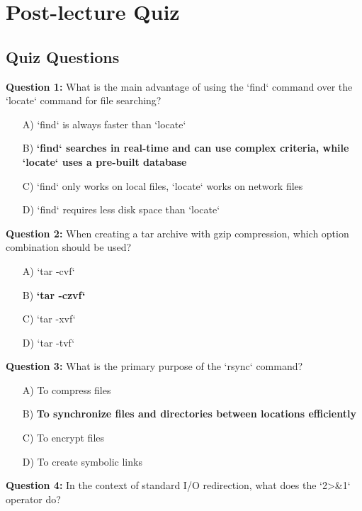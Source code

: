 \section{Post-lecture Quiz}
\label{sec:file-mgmt:post-quiz}

\subsection{Quiz Questions}

\textbf{Question 1:} What is the main advantage of using the `find` command over the `locate` command for file searching?

\begin{enumerate}
    \item[A)] `find` is always faster than `locate`
    \item[B)] \textbf{`find` searches in real-time and can use complex criteria, while `locate` uses a pre-built database}
    \item[C)] `find` only works on local files, `locate` works on network files
    \item[D)] `find` requires less disk space than `locate`
\end{enumerate}

\textbf{Question 2:} When creating a tar archive with gzip compression, which option combination should be used?

\begin{enumerate}
    \item[A)] `tar -cvf`
    \item[B)] \textbf{`tar -czvf`}
    \item[C)] `tar -xvf`
    \item[D)] `tar -tvf`
\end{enumerate}

\textbf{Question 3:} What is the primary purpose of the `rsync` command?

\begin{enumerate}
    \item[A)] To compress files
    \item[B)] \textbf{To synchronize files and directories between locations efficiently}
    \item[C)] To encrypt files
    \item[D)] To create symbolic links
\end{enumerate}

\textbf{Question 4:} In the context of standard I/O redirection, what does the `2>\&1` operator do?

